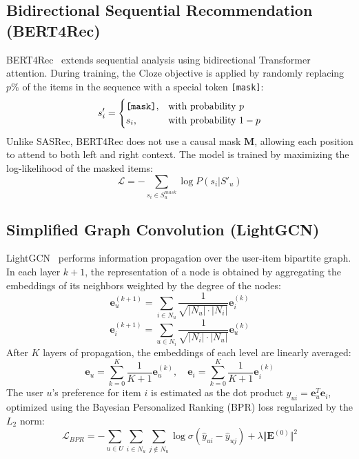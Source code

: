 \documentclass[journal]{IEEEtran}
\begin{document}
\subsection{Bidirectional Sequential Recommendation (BERT4Rec)}
BERT4Rec~\cite{sun2019bert4rec} extends sequential analysis using bidirectional Transformer attention. During training, the Cloze objective is applied by randomly replacing $p\%$ of the items in the sequence with a special token \texttt{[mask]}:
\begin{equation}
s'_i = \begin{cases} \text{\texttt{[mask]}}, & \text{with probability } p \\ s_i, & \text{with probability } 1-p \end{cases}
\end{equation}
Unlike SASRec, BERT4Rec does not use a causal mask $\mathbf{M}$, allowing each position to attend to both left and right context. The model is trained by maximizing the log-likelihood of the masked items:
\begin{equation}
\mathcal{L} = -\sum_{s_i \in S_u^{mask}} \log P(s_i | S'_u)
\end{equation}

\subsection{Simplified Graph Convolution (LightGCN)}
LightGCN~\cite{he2020lightgcn} performs information propagation over the user-item bipartite graph. In each layer $k+1$, the representation of a node is obtained by aggregating the embeddings of its neighbors weighted by the degree of the nodes:
\begin{equation}
\mathbf{e}_u^{(k+1)} = \sum\limits_{i \in N_u} \frac{1}{\sqrt{|N_u| \cdot |N_i|}} \mathbf{e}_i^{(k)}
\end{equation}
\begin{equation}
\mathbf{e}_i^{(k+1)} = \sum\limits_{u \in N_i} \frac{1}{\sqrt{|N_i| \cdot |N_u|}} \mathbf{e}_u^{(k)}
\end{equation}
After $K$ layers of propagation, the embeddings of each level are linearly averaged:
\begin{equation}
\mathbf{e}_u = \sum\limits_{k=0}^K \frac{1}{K+1} \mathbf{e}_u^{(k)}, \quad \mathbf{e}_i = \sum\limits_{k=0}^K \frac{1}{K+1} \mathbf{e}_i^{(k)}
\end{equation}
The user $u$'s preference for item $i$ is estimated as the dot product $\hat{y}_{ui} = \mathbf{e}_u^T \mathbf{e}_i$, optimized using the Bayesian Personalized Ranking (BPR) loss regularized by the $L_2$ norm:
\begin{equation}
\mathcal{L}_{BPR} = -\sum\limits_{u \in U} \sum\limits_{i \in N_u} \sum\limits_{j \notin N_u} \log \sigma(\hat{y}_{ui} - \hat{y}_{uj}) + \lambda \Vert \mathbf{E}^{(0)} \Vert^2
\end{equation}
\end{document}
